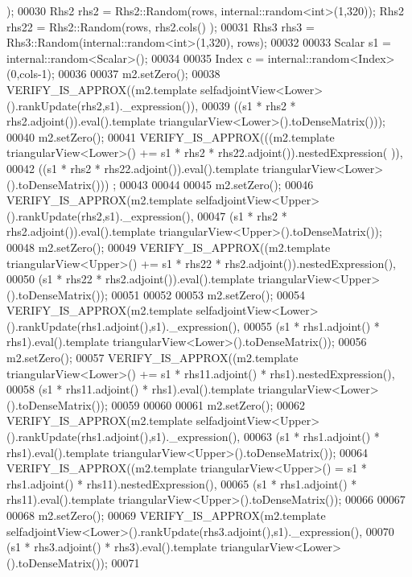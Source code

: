 \begin{DoxyCode}
      );
00030   Rhs2 rhs2 = Rhs2::Random(rows, internal::random<int>(1,320)); Rhs2 rhs22 = Rhs2::Random(rows, rhs2.cols()
      );
00031   Rhs3 rhs3 = Rhs3::Random(internal::random<int>(1,320), rows);
00032 
00033   Scalar s1 = internal::random<Scalar>();
00034   
00035   Index c = internal::random<Index>(0,cols-1);
00036 
00037   m2.setZero();
00038   VERIFY\_IS\_APPROX((m2.template selfadjointView<Lower>().rankUpdate(rhs2,s1).\_expression()),
00039                    ((s1 * rhs2 * rhs2.adjoint()).eval().template triangularView<Lower>().toDenseMatrix()));
00040   m2.setZero();
00041   VERIFY\_IS\_APPROX(((m2.template triangularView<Lower>() += s1 * rhs2  * rhs22.adjoint()).nestedExpression(
      )),
00042                    ((s1 * rhs2 * rhs22.adjoint()).eval().template triangularView<Lower>().toDenseMatrix()))
      ;
00043 
00044   
00045   m2.setZero();
00046   VERIFY\_IS\_APPROX(m2.template selfadjointView<Upper>().rankUpdate(rhs2,s1).\_expression(),
00047                    (s1 * rhs2 * rhs2.adjoint()).eval().template triangularView<Upper>().toDenseMatrix());
00048   m2.setZero();
00049   VERIFY\_IS\_APPROX((m2.template triangularView<Upper>() += s1 * rhs22 * rhs2.adjoint()).nestedExpression(),
00050                    (s1 * rhs22 * rhs2.adjoint()).eval().template triangularView<Upper>().toDenseMatrix());
00051 
00052   
00053   m2.setZero();
00054   VERIFY\_IS\_APPROX(m2.template selfadjointView<Lower>().rankUpdate(rhs1.adjoint(),s1).\_expression(),
00055                    (s1 * rhs1.adjoint() * rhs1).eval().template triangularView<Lower>().toDenseMatrix());
00056   m2.setZero();
00057   VERIFY\_IS\_APPROX((m2.template triangularView<Lower>() += s1 * rhs11.adjoint() * rhs1).nestedExpression(),
00058                    (s1 * rhs11.adjoint() * rhs1).eval().template triangularView<Lower>().toDenseMatrix());
00059   
00060   
00061   m2.setZero();
00062   VERIFY\_IS\_APPROX(m2.template selfadjointView<Upper>().rankUpdate(rhs1.adjoint(),s1).\_expression(),
00063                    (s1 * rhs1.adjoint() * rhs1).eval().template triangularView<Upper>().toDenseMatrix());
00064   VERIFY\_IS\_APPROX((m2.template triangularView<Upper>() = s1 * rhs1.adjoint() * rhs11).nestedExpression(),
00065                    (s1 * rhs1.adjoint() * rhs11).eval().template triangularView<Upper>().toDenseMatrix());
00066 
00067   
00068   m2.setZero();
00069   VERIFY\_IS\_APPROX(m2.template selfadjointView<Lower>().rankUpdate(rhs3.adjoint(),s1).\_expression(),
00070                    (s1 * rhs3.adjoint() * rhs3).eval().template triangularView<Lower>().toDenseMatrix());
00071 

\end{DoxyCode}

